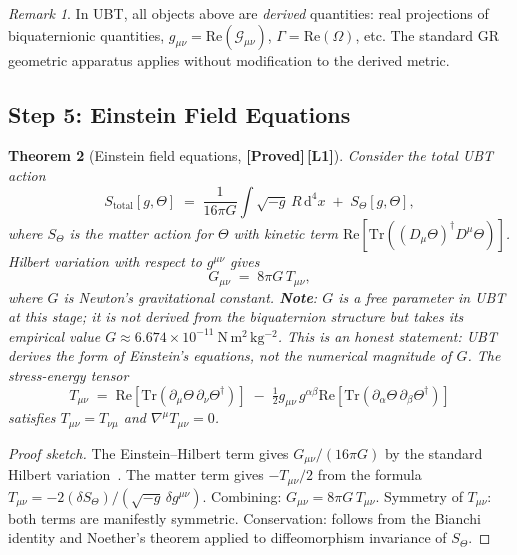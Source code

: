 \documentclass[12pt,a4paper]{article}
\newtheorem{theorem}{Theorem}[section]
\theoremstyle{definition}
\theoremstyle{remark}
\newtheorem{remark}[theorem]{Remark}
\newcommand{\PROVED}{\textbf{[Proved]}}
\newcommand{\Lone}{\textbf{[L1]}}
\newcommand{\Tr}{\mathrm{Tr}}
\newcommand{\re}{\mathrm{Re}}
\newcommand{\calG}{\mathcal{G}}
\begin{document}
\begin{remark}
In UBT, all objects above are \emph{derived} quantities: real projections of
biquaternionic quantities,
$g_{\mu\nu} = \re(\calG_{\mu\nu})$,
$\Gamma = \re(\Omega)$, etc.
The standard GR geometric apparatus applies without modification to the
derived metric.
\end{remark}

\subsection{Step 5: Einstein Field Equations}
\label{sec:step5}

\begin{theorem}[Einstein field equations, \PROVED\,\Lone]
\label{thm:einstein}
Consider the total UBT action
\[
  S_{\mathrm{total}}[g,\Theta]
  \;=\; \frac{1}{16\pi G}\int\!\!\sqrt{-g}\,R\,\mathrm{d}^4x
  \;+\; S_\Theta[g,\Theta],
\]
where $S_\Theta$ is the matter action for $\Theta$ with kinetic term
$\re[\Tr((D_\mu\Theta)^\dagger D^\mu\Theta)]$.
Hilbert variation with respect to $g^{\mu\nu}$ gives
\[
  G_{\mu\nu} \;=\; 8\pi G\,T_{\mu\nu},
\]
where $G$ is Newton's gravitational constant.
\textbf{Note}: $G$ is a free parameter in UBT at this stage; it is not
derived from the biquaternion structure but takes its empirical value
$G \approx 6.674 \times 10^{-11}\ \mathrm{N\,m^2\,kg^{-2}}$.
This is an honest statement: UBT derives the \emph{form} of Einstein's
equations, not the numerical magnitude of $G$.
The stress-energy tensor
\[
  T_{\mu\nu}
  \;=\; \re[\Tr(\partial_\mu\Theta\,\partial_\nu\Theta^\dagger)]
  \;-\; \tfrac{1}{2}g_{\mu\nu}\,g^{\alpha\beta}
        \re[\Tr(\partial_\alpha\Theta\,\partial_\beta\Theta^\dagger)]
\]
satisfies $T_{\mu\nu} = T_{\nu\mu}$ and $\nabla^\mu T_{\mu\nu} = 0$.
\end{theorem}

\begin{proof}[Proof sketch]
The Einstein--Hilbert term gives $G_{\mu\nu}/(16\pi G)$ by the standard
Hilbert variation~\cite{hilbert1915,wald1984}.
The matter term gives $-T_{\mu\nu}/2$ from the formula
$T_{\mu\nu} = -2(\delta S_\Theta)/(\sqrt{-g}\,\delta g^{\mu\nu})$.
Combining: $G_{\mu\nu} = 8\pi G\,T_{\mu\nu}$.
Symmetry of $T_{\mu\nu}$: both terms are manifestly symmetric.
Conservation: follows from the Bianchi identity and Noether's theorem applied
to diffeomorphism invariance of $S_\Theta$.
\end{proof}

\end{document}
